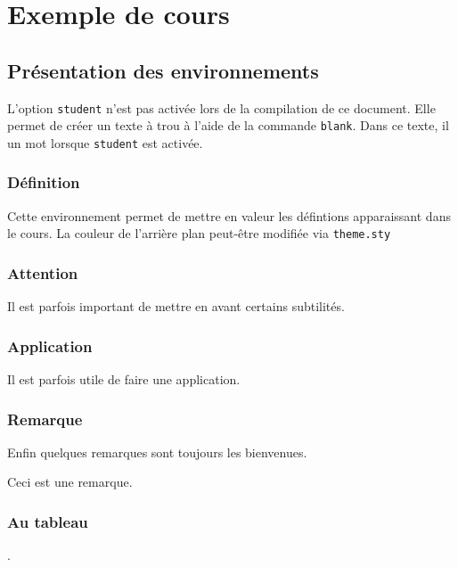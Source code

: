 \documentclass{book}
\begin{document}
\chapter{Exemple de cours}

\section{Présentation des environnements}
L'option \texttt{student} n'est pas activée lors de la compilation de ce document.
Elle permet de créer un texte à trou à l'aide de la commande
\texttt{blank}. Dans ce texte, il  un mot lorsque \texttt{student}
est activée.
\subsection{Définition}
\begin{defn}
	Cette environnement permet de mettre en valeur les défintions 
	apparaissant dans le cours. La couleur de l'arrière plan peut-être
	modifiée via \texttt{theme.sty}
\end{defn}

\subsection{Attention}
Il est parfois important de mettre en avant certains subtilités.
\begin{attention}
	\lipsum[1]
\end{attention}

\subsection{Application}
Il est parfois utile de faire une application.
\begin{application}
	\lipsum[1]
\end{application}

\subsection{Remarque}
Enfin quelques remarques sont toujours les bienvenues.
\begin{rema}
	Ceci est une remarque.
\end{rema}

\subsection{Au tableau}
\begin{tableau}
 \lipsum[2].
\end{tableau}
\end{document}
